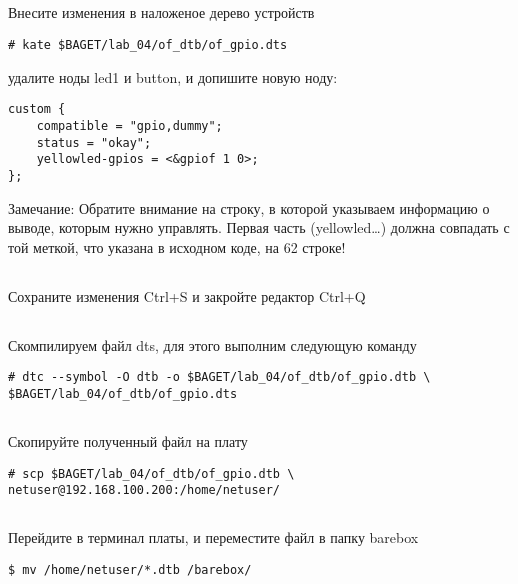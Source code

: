 \subsection{}Внесите изменения в наложеное дерево устройств 
\begin{lstlisting}[style=bash]
# kate $BAGET/lab_04/of_dtb/of_gpio.dts
\end{lstlisting}
удалите ноды led1 и button, и допишите новую ноду:
\begin{lstlisting}[style=stdout]
custom {
	compatible = "gpio,dummy";
	status = "okay";
	yellowled-gpios = <&gpiof 1 0>;
};
\end{lstlisting}
\begin{Notes}{Замечание:}
	Обратите внимание на строку, в которой указываем информацию о выводе, которым нужно управлять. Первая часть (yellowled…) должна совпадать с той меткой, что указана в исходном коде, на 62 строке!
\end{Notes}

\subsection{}Сохраните изменения Ctrl+S и закройте редактор Ctrl+Q 

\subsection{}Скомпилируем файл dts, для этого выполним следующую команду
\begin{lstlisting}[style=bash]
# dtc --symbol -O dtb -o $BAGET/lab_04/of_dtb/of_gpio.dtb \
$BAGET/lab_04/of_dtb/of_gpio.dts
\end{lstlisting}

\subsection{}Скопируйте полученный файл на плату
\begin{lstlisting}[style=bash]
# scp $BAGET/lab_04/of_dtb/of_gpio.dtb \
netuser@192.168.100.200:/home/netuser/
\end{lstlisting}

\subsection{}Перейдите в терминал платы, и переместите файл в папку barebox
\begin{lstlisting}[style=bash]
$ mv /home/netuser/*.dtb /barebox/
\end{lstlisting}


